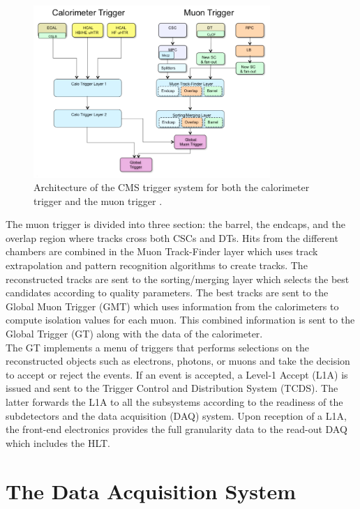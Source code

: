     \begin{figure}[h!]
      \centering
      \includegraphics[width=0.8\textwidth]{img/I-3-cms/l1.png}
      \caption{Architecture of the CMS trigger system for both the calorimeter trigger and the muon trigger \cite{1748-0221-3-08-S08004}.}
      \label{fig:I-3-l1}
    \end{figure}

    The muon trigger is divided into three section: the barrel, the endcaps, and the overlap region where tracks cross both CSCs and DTs. Hits from the different chambers are combined in the Muon Track-Finder layer which uses track extrapolation and pattern recognition algorithms to create tracks. The reconstructed tracks are sent to the sorting/merging layer which selects the best candidates according to quality parameters. The best tracks are sent to the Global Muon Trigger (GMT) which uses information from the calorimeters to compute isolation values for each muon. This combined information is sent to the Global Trigger (GT) along with the data of the calorimeter. \\

    The GT implements a menu of triggers that performs selections on the reconstructed objects such as electrons, photons, or muons and take the decision to accept or reject the events. If an event is accepted, a Level-1 Accept (L1A) is issued and sent to the Trigger Control and Distribution System (TCDS). The latter forwards the L1A to all the subsystems according to the readiness of the subdetectors and the data acquisition (DAQ) system. Upon reception of a L1A, the front-end electronics provides the full granularity data to the read-out DAQ which includes the HLT.

  \section{The Data Acquisition System}

